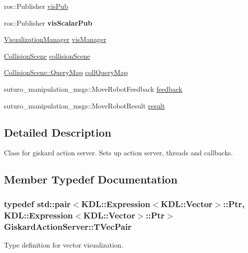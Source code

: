 \begin{DoxyCompactItemize}
\item 
ros\-::\-Publisher \hyperlink{classGiskardActionServer_ad5faa562d8e3e2ea964effb5df90775b}{vis\-Pub}
\item 
\hypertarget{classGiskardActionServer_a6759ab8fd7b1bb1ed5b8341801d483a5}{ros\-::\-Publisher {\bfseries vis\-Scalar\-Pub}}\label{classGiskardActionServer_a6759ab8fd7b1bb1ed5b8341801d483a5}

\item 
\hyperlink{classVisualizationManager}{Visualization\-Manager} \hyperlink{classGiskardActionServer_a4aca89815a5d0cb84475773401613365}{vis\-Manager}
\item 
\hyperlink{classCollisionScene}{Collision\-Scene} \hyperlink{classGiskardActionServer_a9092b32b81ae2e3c13ab6f5632e716a1}{collision\-Scene}
\item 
\hyperlink{classMutexMap}{Collision\-Scene\-::\-Query\-Map} \hyperlink{classGiskardActionServer_a6dc2df6171c07b6c15e20e91533b0430}{coll\-Query\-Map}
\item 
suturo\-\_\-manipulation\-\_\-msgs\-::\-Move\-Robot\-Feedback \hyperlink{classGiskardActionServer_aaa0e1708f9a1af19c33986f0504e7f34}{feedback}
\item 
suturo\-\_\-manipulation\-\_\-msgs\-::\-Move\-Robot\-Result \hyperlink{classGiskardActionServer_a62a22a3a61a61b36a2b4c0d5f6ed1e70}{result}
\end{DoxyCompactItemize}


\subsection{Detailed Description}
Class for giskard action server. Sets up action server, threads and callbacks. 

\subsection{Member Typedef Documentation}
\hypertarget{classGiskardActionServer_a49b67ed22398144efcae8cf2d6596f9e}{
\subsubsection[{T\-Vec\-Pair}]{\setlength{\rightskip}{0pt plus 5cm}typedef std\-::pair$<$K\-D\-L\-::\-Expression$<$K\-D\-L\-::\-Vector$>$\-::Ptr, K\-D\-L\-::\-Expression$<$K\-D\-L\-::\-Vector$>$\-::Ptr$>$ {\bf Giskard\-Action\-Server\-::\-T\-Vec\-Pair}\hspace{0.3cm}{\ttfamily [private]}}}\label{classGiskardActionServer_a49b67ed22398144efcae8cf2d6596f9e}
Type definition for vector visualization. 


